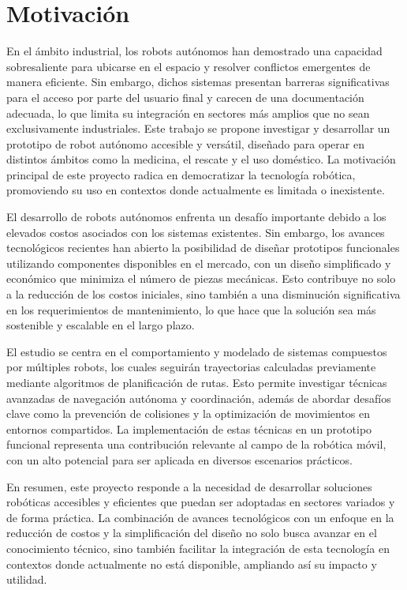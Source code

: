 \newpage
\chapter*{Motivación}

En el ámbito industrial, los robots autónomos han demostrado una capacidad sobresaliente para ubicarse en el espacio y resolver conflictos emergentes de manera eficiente. Sin embargo, dichos sistemas presentan barreras significativas para el acceso por parte del usuario final y carecen de una documentación adecuada, lo que limita su integración en sectores más amplios que no sean exclusivamente industriales. Este trabajo se propone investigar y desarrollar un prototipo de robot autónomo accesible y versátil, diseñado para operar en distintos ámbitos como la medicina, el rescate y el uso doméstico. La motivación principal de este proyecto radica en democratizar la tecnología robótica, promoviendo su uso en contextos donde actualmente es limitada o inexistente.

El desarrollo de robots autónomos enfrenta un desafío importante debido a los elevados costos asociados con los sistemas existentes. Sin embargo, los avances tecnológicos recientes han abierto la posibilidad de diseñar prototipos funcionales utilizando componentes disponibles en el mercado, con un diseño simplificado y económico que minimiza el número de piezas mecánicas. Esto contribuye no solo a la reducción de los costos iniciales, sino también a una disminución significativa en los requerimientos de mantenimiento, lo que hace que la solución sea más sostenible y escalable en el largo plazo.

El estudio se centra en el comportamiento y modelado de sistemas compuestos por múltiples robots, los cuales seguirán trayectorias calculadas previamente mediante algoritmos de planificación de rutas. Esto permite investigar técnicas avanzadas de navegación autónoma y coordinación, además de abordar desafíos clave como la prevención de colisiones y la optimización de movimientos en entornos compartidos. La implementación de estas técnicas en un prototipo funcional representa una contribución relevante al campo de la robótica móvil, con un alto potencial para ser aplicada en diversos escenarios prácticos.

En resumen, este proyecto responde a la necesidad de desarrollar soluciones robóticas accesibles y eficientes que puedan ser adoptadas en sectores variados y de forma práctica. La combinación de avances tecnológicos con un enfoque en la reducción de costos y la simplificación del diseño no solo busca avanzar en el conocimiento técnico, sino también facilitar la integración de esta tecnología en contextos donde actualmente no está disponible, ampliando así su impacto y utilidad.

